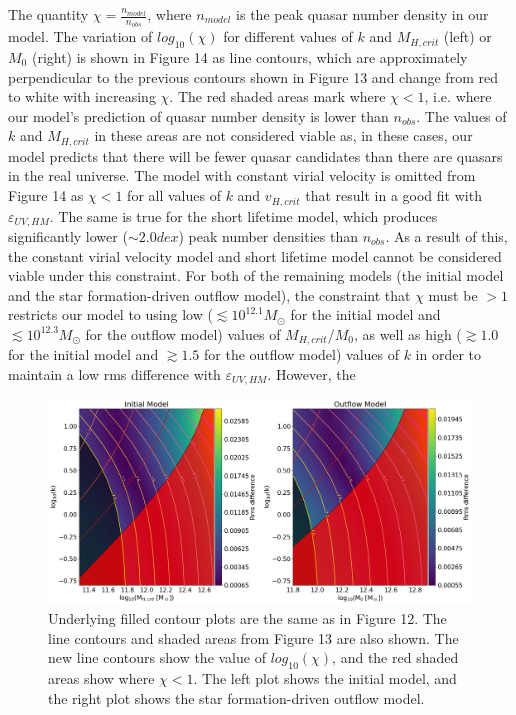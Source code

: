 \documentclass[12pt, twocolumn]{report}%
\begin{document}
The quantity $\chi=\frac{n_{model}}{n_{obs}}$, where $n_{model}$ is the peak quasar number density in our model. The variation of $log_{10}(\chi)$ for different values of $k$ and $M_{H,crit}$ (left) or $M_0$ (right) is shown in Figure 14 as line contours, which are approximately perpendicular to the previous contours shown in Figure 13 and change from red to white with increasing $\chi$. The red shaded areas mark where $\chi<1$, i.e. where our model's prediction of quasar number density is lower than $n_{obs}$. The values of $k$ and $M_{H,crit}$ in these areas are not considered viable as, in these cases, our model predicts that there will be fewer quasar candidates than there are quasars in the real universe. The model with constant virial velocity is omitted from Figure 14 as $\chi<1$ for all values of $k$ and $v_{H,crit}$ that result in a good fit with $\varepsilon_{UV,HM}$. The same is true for the short lifetime model, which produces significantly lower ($\sim2.0dex$) peak number densities than $n_{obs}$. As a result of this, the constant virial velocity model and short lifetime model cannot be considered viable under this constraint. For both of the remaining models (the initial model and the star formation-driven outflow model), the constraint that $\chi$ must be $>1$ restricts our model to using low ($\lesssim10^{12.1}M_\odot$ for the initial model and $\lesssim10^{12.3}M_\odot$ for the outflow model) values of $M_{H,crit}$/$M_0$, as well as high ($\gtrsim1.0$ for the initial model and $\gtrsim1.5$ for the outflow model) values of $k$ in order to maintain a low rms difference with $\varepsilon_{UV,HM}$. However, the

\onecolumngrid


\begin{figure}[H]
\centering
\includegraphics[width=\linewidth]{Contour_3.png}
\caption{Underlying filled contour plots are the same as in Figure 12. The line contours and shaded areas from Figure 13 are also shown. The new line contours show the value of $log_{10}(\chi)$, and the red shaded areas show where $\chi<1$. The left plot shows the initial model, and the right plot shows the star formation-driven outflow model.}
\label{fig:14}
\end{figure}
\end{document}
